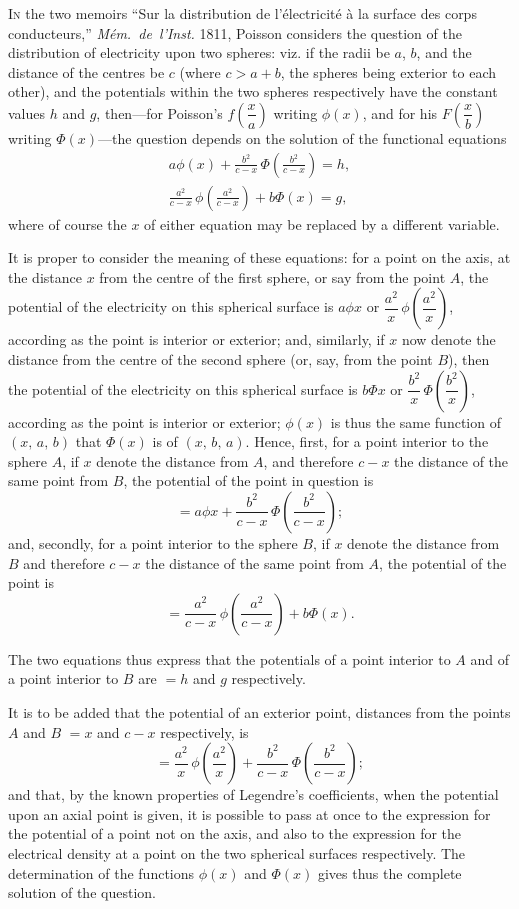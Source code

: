 \documentclass[12pt,a4paper,oneside]{book}
\theoremstyle{plain}
\theoremstyle{definition}
\theoremstyle{remark}
\begin{document}
\textsc{In} the two memoirs ``Sur la distribution de l'\'electricit\'e \`a la surface des corps conducteurs,'' \textit{M\'em.~de~l'Inst.} 1811, Poisson considers the question of the distribution of electricity upon two spheres: viz. if the radii be $a$, $b$, and the distance of the centres be $c$ (where $c > a+b$, the spheres being exterior to each other), and the potentials within the two spheres respectively have the constant values $h$ and $g$, then---for Poisson's $f\!\left(\dfrac{x}{a}\right)$ writing $\phi(x)$, and for his $F\!\left(\dfrac{x}{b}\right)$ writing $\Phi(x)$---the question depends on the solution of the functional equations
\begin{gather*}
a\phi(x) + \frac{b^2}{c-x}\,\Phi\!\left(\frac{b^2}{c-x}\right) = h,\\
\frac{a^2}{c-x}\,\phi\!\left(\frac{a^2}{c-x}\right) + b\Phi(x) = g,
\end{gather*}
where of course the $x$ of either equation may be replaced by a different variable.

It is proper to consider the meaning of these equations: for a point on the axis, at the distance $x$ from the centre of the first sphere, or say from the point $A$, the potential of the electricity on this spherical surface is $a\phi x$ or $\dfrac{a^2}{x}\,\phi\!\left(\dfrac{a^2}{x}\right)$, according as the point is interior or exterior; and, similarly, if $x$ now denote the distance from the centre of the second sphere (or, say, from the point $B$), then the potential of the electricity on this spherical surface is $b\Phi x$ or $\dfrac{b^2}{x}\,\Phi\!\left(\dfrac{b^2}{x}\right)$, according as the point is interior or exterior; $\phi(x)$ is thus the same function of $(x,\, a,\, b)$ that $\Phi(x)$ is of $(x,\, b,\, a)$. Hence, first, for a point interior to the sphere $A$, if $x$ denote the distance from $A$, and therefore $c-x$ the distance of the same point from $B$, the potential of the point in question is
\[
= a\phi x + \frac{b^2}{c-x}\,\Phi\!\left(\frac{b^2}{c-x}\right);
\]
and, secondly, for a point interior to the sphere $B$, if $x$ denote the distance from $B$ and therefore $c-x$ the distance of the same point from $A$, the potential of the point is
\[
= \frac{a^2}{c-x}\,\phi\!\left(\frac{a^2}{c-x}\right) + b\Phi(x).
\]

The two equations thus express that the potentials of a point interior to $A$ and of a point interior to $B$ are $=h$ and $g$ respectively.

It is to be added that the potential of an exterior point, distances from the points $A$ and $B$ $=x$ and $c-x$ respectively, is
\[
= \frac{a^2}{x}\,\phi\!\left(\frac{a^2}{x}\right) + \frac{b^2}{c-x}\,\Phi\!\left(\frac{b^2}{c-x}\right);
\]
and that, by the known properties of Legendre's coefficients, when the potential upon an axial point is given, it is possible to pass at once to the expression for the potential of a point not on the axis, and also to the expression for the electrical density at a point on the two spherical surfaces respectively. The determination of the functions $\phi(x)$ and $\Phi(x)$ gives thus the complete solution of the question.
\end{document}
